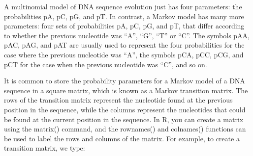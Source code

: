 \documentclass[
]{book}
\begin{document}
A multinomial model of DNA sequence evolution just has four parameters: the probabilities pA, pC, pG, and pT. In contrast, a Markov model has many more parameters: four sets of probabilities pA, pC, pG, and pT, that differ according to whether the previous nucleotide was ``A'', ``G'', ``T'' or ``C''. The symbols pAA, pAC, pAG, and pAT are usually used to represent the four probabilities for the case where the previous nucleotide was ``A'', the symbols pCA, pCC, pCG, and pCT for the case when the previous nucleotide was ``C'', and so on.

It is common to store the probability parameters for a Markov model of a DNA sequence in a square matrix, which is known as a Markov transition matrix. The rows of the transition matrix represent the nucleotide found at the previous position in the sequence, while the columns represent the nucleotides that could be found at the current position in the sequence. In R, you can create a matrix using the matrix() command, and the rownames() and colnames() functions can be used to label the rows and columns of the matrix. For example, to create a transition matrix, we type:
\end{document}

